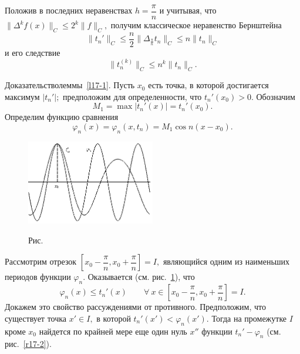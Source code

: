Положив в последних неравенствах $h=\dfrac{\pi}{n}$ и
учитывая, что $\|\Delta^kf(x)\|_C\le 2^k\|f\|_C,$
 получим классическое неравенство  Бернштейна
\begin{equation}\label{17-2}
 \|t_n'\|_C\le \frac{n}{2} \|\Delta_{\frac{\pi}{n}} t_n\|_C \le
 n\|t_n\|_C
\end{equation}
и его следствие
$$
\|t_n^{(k)}\|_C\le n^k \|t_n\|_C.
$$


 Д\;о\;к\;а\;з\;а\;т\;е\;л\;ь\;с\;т\;в\;о\quad  леммы~\ref{l17-1}. Пусть $x_0$ есть точка,
 в которой достигается максимум $|t_n'|;$ предположим для определенности, что
 $t_n'(x_0)>0.$ Обозначим
 $$
 M_1= \max |t_n'(x)|=t_n'(x_0).
 $$
 Определим  функцию сравнения
 $$
 \varphi_n(x)= \varphi_n(x,t_n)=M_1\cos n(x-x_0).
 $$




\begin{figure}[ht]
\begin{center}
\includegraphics[width=0.5\textwidth]{pict/pict17-1.eps}
\end{center}
 \label{r17-1}
 \centerline{Рис.~\theris}
\end{figure}

 \noindent
 Рассмотрим отрезок $\left[ x_0-\dfrac{\pi}{n}, x_0+\dfrac{\pi}{n}
 \right]=I,$ являющийся одним из наименьших периодов функции $\varphi_n.$
 Оказывается (см. рис.~\ref{r17-1}), что
$$
 \varphi_n(x)\le t_n'(x)\qquad \forall\ x\in
 \left[ x_0-\frac{\pi}{n}, x_0+\frac{\pi}{n}\right]=I.
$$
 Докажем это свойство рассуждениями  от противного. Предположим, что существует точка $x'\in I,$
 в которой $t_n'(x')< \varphi_n(x').$ {Тогда на промежутке $I$ кроме $x_0$ найдется}
{по крайней мере еще один нуль $x''$ функции
$t_n'-\varphi_n$ {(см. рис.~\ref{r17-2}).}}

